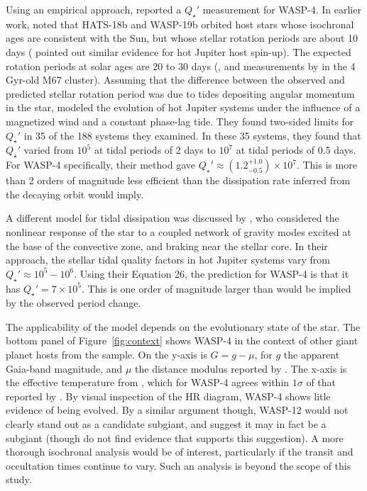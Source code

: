 \documentclass[12pt,twocolumn,tighten]{aastex62}
\begin{document}
Using an empirical approach, \citet{penev_empirical_2018} reported a
$Q_\star'$ measurement for WASP-4.  In earlier work,
\citet{penev_hats-18b_2016} noted that HATS-18b and WASP-19b orbited
host stars whose isochronal ages are consistent with the Sun, but
whose stellar rotation periods are about 10 days
(\citealt{pont_empirical_2009} pointed out similar evidence for hot
Jupiter host spin-up).  The expected rotation periods at solar ages
are 20 to 30 days
(\citealt{schatzman_theory_1962,skumanich_time_1972}, and measurements
by \citealt{barnes_rotation_2016} in the 4\,Gyr-old M67 cluster).
Assuming that the difference between the observed and predicted
stellar rotation period was due to tides depositing angular momentum
in the star, \citet{penev_empirical_2018} modeled the evolution of hot
Jupiter systems under the influence of a magnetized wind and a
constant phase-lag tide.  They found two-sided limits for $Q_\star'$
in 35 of the 188 systems they examined.  In these 35 systems, they
found that $Q_\star'$ varied from $10^5$ at tidal periods of 2 days to
$10^7$ at tidal periods of 0.5 days.  For WASP-4 specifically, their
method gave $Q_\star' \approx (1.2^{+1.0}_{-0.5})\times10^7$. This is
more than 2 orders of magnitude less efficient than the dissipation
rate inferred from the decaying orbit would imply.

A different model for tidal dissipation was discussed by
\citet{essick_orbital_2016}, who considered the nonlinear response of
the star to a coupled network of gravity modes excited at the base of
the convective zone, and braking near the stellar core.  In their
approach, the stellar tidal quality factors in hot Jupiter systems
vary from $Q_\star' \approx 10^5 - 10^6$.  Using their Equation 26,
the prediction for WASP-4 is that it has $Q_\star' = 7\times10^5$.
This is one order of magnitude larger than would be implied by the
observed period change.

The applicability of the \citet{essick_orbital_2016} model depends on
the evolutionary state of the star.  The bottom panel of
Figure~\ref{fig:context} shows WASP-4 in the context of other giant
planet hosts from the \citet{bonomo_gaps_2017} sample.  On the y-axis
is $G=g-\mu$, for $g$ the apparent Gaia-band magnitude, and $\mu$ the
distance modulus reported by \citet{gaia_collaboration_gaia_2018}.
The x-axis is the effective temperature from \citet{bonomo_gaps_2017},
which for WASP-4 agrees within $1\sigma$ of that reported by
\citet{petrucci_no_2013}.  By visual inspection of the HR diagram,
WASP-4 shows litle evidence of being evolved.  By a similar argument
though, WASP-12 would not clearly stand out as a candidate subgiant,
and \citet{weinberg_tidal_2017} suggest it may in fact be a subgiant
(though \citealt{bailey_understanding_2019} do not find evidence that
supports this suggestion).  A more thorough isochronal analysis would
be of interest, particularly if the transit and occultation times
continue to vary.  Such an analysis is beyond the scope of this study.
\end{document}
